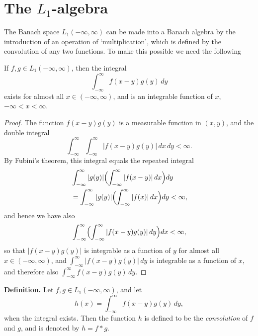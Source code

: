 \section{The \texorpdfstring{$L_1$}{L1}-algebra}
\label{sec:I-2}

The Banach space $L_1(-\infty,\infty)$ can be made into a Banach algebra by the introduction of an operation of `multiplication', which is defined by the convolution of any two functions. To make this possible we need the following

\begin{lemma}\label{lem:I-2.1}
If $f,g\in L_1(-\infty,\infty)$, then the integral
\begin{equation}\label{eq:I-2.1}
\int_{-\infty}^{\infty}f(x-y)g(y)\,dy
\end{equation}
exists for almost all $x\in(-\infty,\infty)$, and is an integrable function of $x$, $-\infty<x<\infty$.
\end{lemma}

\begin{proof}
The function $f(x-y)g(y)$ is a measurable function in $(x,y)$, and the double integral
\begin{equation*}
\int_{-\infty}^{\infty}\int_{-\infty}^{\infty}|f(x-y)g(y)|\,dx\,dy<\infty.
\end{equation*}
By Fubini's theorem, this integral equals the repeated integral
\begin{equation*}
\begin{aligned}
&\int_{-\infty}^{\infty}|g(y)|  \Bigl(\int_{-\infty}^{\infty}|f(x-y)|\,dx\Bigr)dy\\
&= \int_{-\infty}^{\infty}|g(y)|  \Bigl(\int_{-\infty}^{\infty}|f(x)|\,dx\Bigr)dy < \infty,
\end{aligned}
\end{equation*}
and hence we have also
\begin{equation*}
\int_{-\infty}^{\infty}\Bigl(\int_{-\infty}^{\infty}|f(x-y)g(y)|\,dy\Bigr)dx<\infty,
\end{equation*}
so that $|f(x-y)g(y)|$ is integrable as a function of $y$ for almost all $x\in(-\infty,\infty)$, and $\int_{-\infty}^{\infty}|f(x-y)g(y)|\,dy$ is integrable as a function of $x$, and therefore also $\int_{-\infty}^{\infty}f(x-y)g(y)\,dy$.
\end{proof}

\noindent\textbf{Definition.}
Let $f,g\in L_1(-\infty,\infty)$, and let
\begin{equation*}
h(x)=\int_{-\infty}^{\infty}f(x-y)g(y)\,dy,
\end{equation*}
when the integral exists. Then the function $h$ is defined to be the \emph{convolution} of $f$ and $g$, and is denoted by $h=f*g$.

